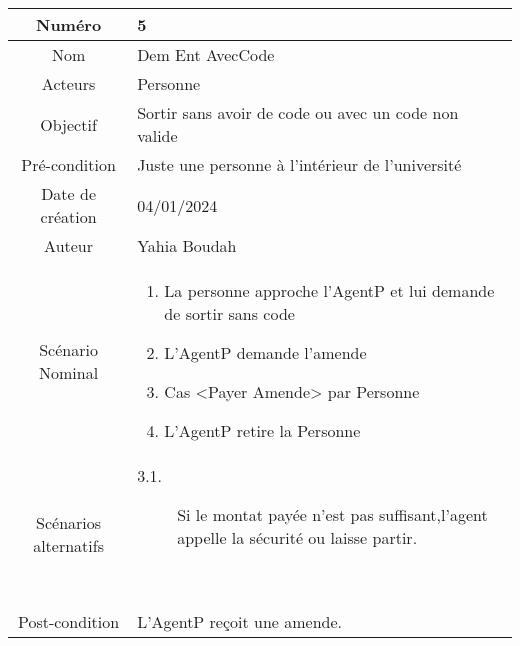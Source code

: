 

\begin{tabular}{ |c|p{12cm}| }
    \hline
    Numéro & 5 \\
    \hline
    Nom & Dem Ent AvecCode \\
    \hline
    Acteurs & Personne \\ 
    \hline
    Objectif & Sortir sans avoir de code ou avec un code non valide \\ 
    \hline
    Pré-condition & Juste une personne à l'intérieur de l'université \\
    \hline
    Date de création & 04/01/2024 \\
    \hline
    Auteur & Yahia Boudah \\
    \hline
    Scénario Nominal & \begin{enumerate}
        \item La personne approche l'AgentP et lui demande de sortir sans code
        \item L'AgentP demande l'amende
        \item Cas <Payer Amende> par Personne
        \item L'AgentP retire la Personne
    \end{enumerate} \\
    \hline
    Scénarios alternatifs & \begin{description}
        \item[3.1.] Si le montat payée n'est pas suffisant,l'agent appelle la sécurité ou laisse partir.
    \end{description} \\
    \hline
    Post-condition & L'AgentP reçoit une amende. \\
    \hline
\end{tabular}